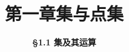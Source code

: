 \everymath{\displaystyle}



\title[第一章\\
集与点集]{\texorpdfstring{\LARGE \bfseries 第一章\quad 集与点集}{第一章 集与点集}} %
\author[\S 1.1\\
集及其运算] %
{\Large \bfseries \S 1.1 集及其运算}
\date{}





